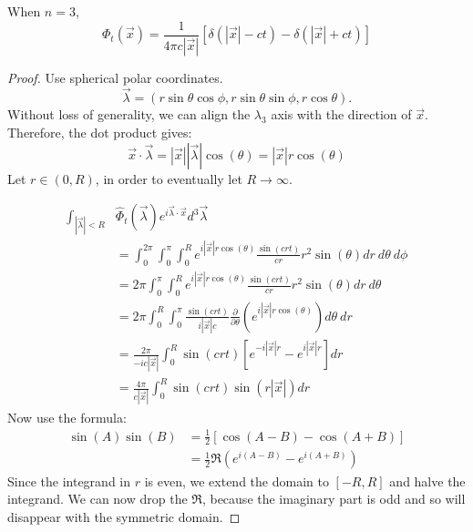 \documentclass[../Main.tex]{subfiles}
\begin{document}
\begin{proposition}
    When $n = 3$,
    \begin{equation}
        \Phi_t(\vec{x}) = \frac{1}{4\pi c |\vec{x}|} \left[\delta(|\vec{x}| - ct) - \delta(|\vec{x}| + ct)\right]
        \label{eqnWaveFunc3Dim}
    \end{equation}
    \label{propWaveFunc3Dim}
\end{proposition}
\begin{proof}
    Use spherical polar coordinates.
    \begin{equation*}
        \vec{\lambda} = (r\sin\theta \cos\phi, r\sin\theta\sin\phi, r\cos\theta).
    \end{equation*}
    Without loss of generality, we can align the $\lambda_3$ axis with the direction of $\vec{x}$. Therefore, the dot product gives:
    \begin{equation*}
        \vec{x} \cdot \vec{\lambda} = |\vec{x}||\vec{\lambda}|\cos(\theta) = |\vec{x}| r \cos(\theta)
    \end{equation*}
    Let $r \in (0, R)$, in order to eventually let $R \to \infty$.

    \begin{align*}
        \int_{|\vec{\lambda}| < R}&\hat{\Phi}_t(\vec{\lambda}) e^{i \vec{\lambda} \cdot \vec{x}} d^3 \vec{\lambda} \\
        &= \int_{0}^{2\pi} \int_{0}^{\pi} \int_{0}^{R} e^{i|\vec{x}|r \cos(\theta)} \frac{\sin(c r t)}{cr} r^2 \sin(\theta) dr~d\theta~d\phi \\
        &= 2\pi \int_{0}^{\pi} \int_{0}^{R} e^{i|\vec{x}|r \cos(\theta)} \frac{\sin(c r t)}{cr} r^2 \sin(\theta) dr~d\theta \\
        &= 2\pi \int_{0}^{R} \int_{0}^{\pi} \frac{\sin(crt)}{i|\vec{x}| c} \frac{\partial}{\partial \theta} \left(e^{i|\vec{x}| r \cos(\theta)}\right) d\theta~dr \\
        &= \frac{2\pi}{-ic |\vec{x}|} \int_{0}^{R} \sin(crt) \left[e^{-i |\vec{x}| r} - e^{i |\vec{x}| r}\right] dr \\
        &= \frac{4\pi}{c |\vec{x}|} \int_{0}^{R} \sin(crt) \sin(r|\vec{x}|) dr
    \end{align*}
    Now use the formula:
    \begin{align*}
        \sin(A) \sin(B) &= \frac12 \left[\cos(A - B) - \cos(A + B)\right] \\
        &= \frac12 \Re(e^{i(A - B)} - e^{i(A + B)})
    \end{align*}
    Since the integrand in $r$ is even, we extend the domain to $[-R, R]$ and halve the integrand. We can now drop the $\Re$, because the imaginary part is odd and so will disappear with the symmetric domain.


\end{proof}
\end{document}
